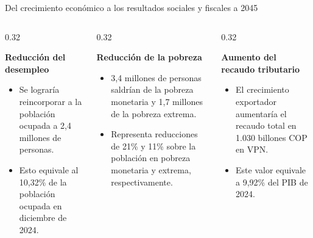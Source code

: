 \documentclass[aspectratio=169,xcolor=dvipsnames]{beamer}
\begin{document}
\begin{frame}{Del crecimiento económico a los resultados sociales y fiscales a 2045}

    \begin{columns}[T]
        \begin{column}{0.32\textwidth}
            \centering
            
            \textbf{Reducción del desempleo}
            \begin{itemize}
                \item Se lograría reincorporar a la población ocupada a 2,4 millones de personas.
                \item Esto equivale al 10,32\% de la población ocupada en diciembre de 2024.
            \end{itemize}
        \end{column}
        \begin{column}{0.32\textwidth}
            
            \textbf{Reducción de la pobreza}
            \begin{itemize}
                \item 3,4 millones de personas saldrían de la pobreza monetaria y 1,7 millones de la pobreza extrema.
                \item Representa reducciones de 21\% y 11\% sobre la población en pobreza monetaria y extrema, respectivamente.
            \end{itemize}
        \end{column}
        \begin{column}{0.32\textwidth}
            
            \textbf{Aumento del recaudo tributario}
            \begin{itemize}
                \item El crecimiento exportador aumentaría el recaudo total en 1.030 billones COP en VPN.
                \item Este valor equivale a 9,92\% del PIB de 2024.
            \end{itemize}
        \end{column}
    \end{columns}
\end{frame}
\end{document}
